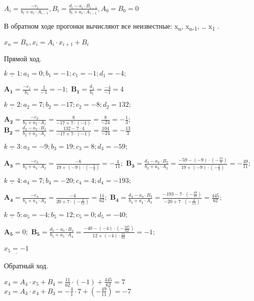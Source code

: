 \documentclass[10pt, a4paper]{scrartcl}
\begin{document}
\(\displaystyle A_i = \frac{-c_i}{b_i + a_i \cdot A_{i-1}}, B_i = \frac{d_i - a_i \cdot B_{i-1}}{b_i + a_i \cdot A_{i-1}}, A_0 = B_0 = 0\)

В обратном ходе прогонки вычисляют все неизвестные: x\textsubscript{n},
x\textsubscript{n-1}, \ldots{} x\textsubscript{1} .

\(\displaystyle x_n = B_n, x_i = A_i \cdot x_{i+1} + B_i\)

Прямой ход.

\(\underline{k = 1}: a_1 = 0; b_1 = -1; c_1 = -1; d_1 = -4;\)

\(\displaystyle \mathbf{A_1} = \frac{-c_1}{b_1} = \frac{1}{-1} = -1;\)
\(\displaystyle \mathbf{B_1} = \frac{d_1}{b_1} = \frac{-4}{-1} = 4\)

\(\underline{k = 2}: a_2 = 7; b_2 = -17; c_2 = -8; d_2 = 132;\)

\(\displaystyle \mathbf{A_2} = \frac{-c_2}{b_2 + a_2\cdot A_1} = \frac{8}{-17+7\cdot(-1)} = \frac{8}{-24} = -\frac{1}{3};\)
\(\displaystyle \mathbf{B_2} = \frac{d_2 - a_2\cdot B_1}{b_2 + a_2\cdot A_1} = \frac{132-7\cdot 4}{-17+7\cdot (-1)} = \frac{104}{-24} = -\frac{13}{3}\)

\(\underline{k = 3}: a_3 = -9; b_3 = 19; c_3 = 8; d_3 = -59;\)

\(\displaystyle \mathbf{A_3} = \frac{-c_3}{b_3 + a_3\cdot A_2} = \frac{-8}{19+(-9)\cdot (-\frac{1}{3})} = -\frac{4}{11};\)
\(\displaystyle \mathbf{B_3} = \frac{d_3 - a_3\cdot B_2}{b_3 + a_3\cdot A_2} = \frac{-59-(-9)\cdot (-\frac{13}{3})}{19+(-9)\cdot (-\frac{1}{3})} = -\frac{49}{11};\)

\(\underline{k = 4}: a_4 = 7; b_4 = -20; c_4 = 4; d_4 = -193;\)

\(\displaystyle \mathbf{A_4} = \frac{-c_4}{b_4 + a_4\cdot A_3} = \frac{-4}{20+7\cdot (-\frac{4}{11})} = \frac{11}{62};\)
\(\displaystyle \mathbf{B_4} = \frac{d_4 - a_4\cdot B_3}{b_4 + a_4\cdot A_3} = \frac{-193-7\cdot (-\frac{49}{11})}{-20+7\cdot (-\frac{4}{11})} = \frac{445}{62};\)

\(\underline{k = 5}: a_5 = -4; b_5 = 12; c_5 = 0; d_5 = -40;\)

\(\displaystyle \mathbf{A_5} = 0;\)
\(\displaystyle \mathbf{B_5} = \frac{d_5 - a_5\cdot B_4}{b_5 + a_5\cdot A_4} = \frac{-40-(-4)\cdot (-\frac{445}{62})}{12+(-4)\cdot \frac{11}{62}} = -1;\)

\(\displaystyle \underline{x_5 = -1}\)

Обратный ход.

\(\displaystyle x_4 = A_4\cdot x_5 + B_4 = \frac{11}{62}\cdot(-1) + \frac{445}{62} = 7\)
\(\displaystyle x_3 = A_3\cdot x_4 + B_3 = -\frac{4}{1}\cdot7 + (-\frac{49}{11}) = -7\)
\end{document}
